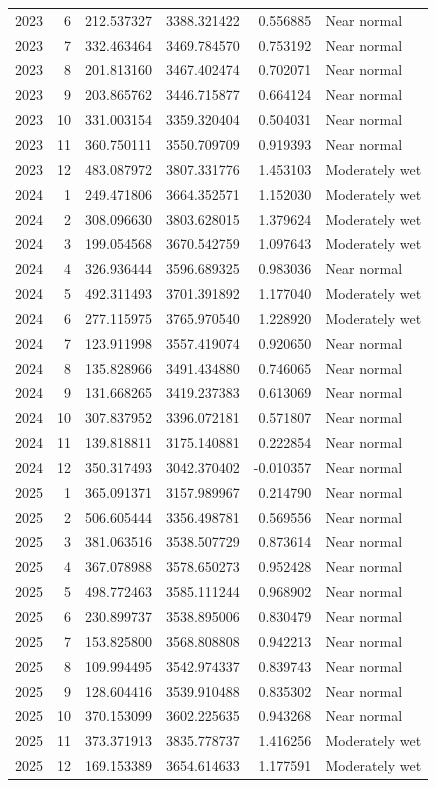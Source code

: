 \begin{tabular}{rrrrrl}
2023 & 6 & 212.537327 & 3388.321422 & 0.556885 & Near normal \\
2023 & 7 & 332.463464 & 3469.784570 & 0.753192 & Near normal \\
2023 & 8 & 201.813160 & 3467.402474 & 0.702071 & Near normal \\
2023 & 9 & 203.865762 & 3446.715877 & 0.664124 & Near normal \\
2023 & 10 & 331.003154 & 3359.320404 & 0.504031 & Near normal \\
2023 & 11 & 360.750111 & 3550.709709 & 0.919393 & Near normal \\
2023 & 12 & 483.087972 & 3807.331776 & 1.453103 & Moderately wet \\
2024 & 1 & 249.471806 & 3664.352571 & 1.152030 & Moderately wet \\
2024 & 2 & 308.096630 & 3803.628015 & 1.379624 & Moderately wet \\
2024 & 3 & 199.054568 & 3670.542759 & 1.097643 & Moderately wet \\
2024 & 4 & 326.936444 & 3596.689325 & 0.983036 & Near normal \\
2024 & 5 & 492.311493 & 3701.391892 & 1.177040 & Moderately wet \\
2024 & 6 & 277.115975 & 3765.970540 & 1.228920 & Moderately wet \\
2024 & 7 & 123.911998 & 3557.419074 & 0.920650 & Near normal \\
2024 & 8 & 135.828966 & 3491.434880 & 0.746065 & Near normal \\
2024 & 9 & 131.668265 & 3419.237383 & 0.613069 & Near normal \\
2024 & 10 & 307.837952 & 3396.072181 & 0.571807 & Near normal \\
2024 & 11 & 139.818811 & 3175.140881 & 0.222854 & Near normal \\
2024 & 12 & 350.317493 & 3042.370402 & -0.010357 & Near normal \\
2025 & 1 & 365.091371 & 3157.989967 & 0.214790 & Near normal \\
2025 & 2 & 506.605444 & 3356.498781 & 0.569556 & Near normal \\
2025 & 3 & 381.063516 & 3538.507729 & 0.873614 & Near normal \\
2025 & 4 & 367.078988 & 3578.650273 & 0.952428 & Near normal \\
2025 & 5 & 498.772463 & 3585.111244 & 0.968902 & Near normal \\
2025 & 6 & 230.899737 & 3538.895006 & 0.830479 & Near normal \\
2025 & 7 & 153.825800 & 3568.808808 & 0.942213 & Near normal \\
2025 & 8 & 109.994495 & 3542.974337 & 0.839743 & Near normal \\
2025 & 9 & 128.604416 & 3539.910488 & 0.835302 & Near normal \\
2025 & 10 & 370.153099 & 3602.225635 & 0.943268 & Near normal \\
2025 & 11 & 373.371913 & 3835.778737 & 1.416256 & Moderately wet \\
2025 & 12 & 169.153389 & 3654.614633 & 1.177591 & Moderately wet \\
\bottomrule
\end{tabular}
